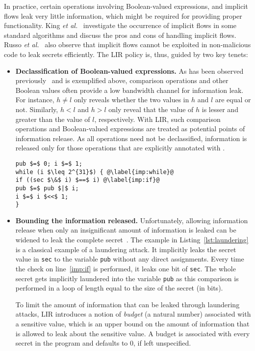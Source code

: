 In practice, certain operations involving Boolean-valued expressions, 
and implicit flows leak very 
little information, which might be required for providing proper
functionality. King \emph{et al.}~\cite{king08implicit} 
investigate the occurrence of implicit flows in some standard 
algorithms and discuss the pros and cons of handling implicit 
flows. Russo \emph{et al.}~\cite{implicit} also observe
that implicit flows cannot be exploited in non-malicious code to 
leak secrets efficiently. The LIR policy is, thus, guided by two key tenets: 

\begin{itemize}
\item \textbf{Declassification of Boolean-valued expressions.}  As has been
  observed previously~\cite{scd, dta} and is exemplified
  above, comparison operations and other Boolean values often provide a
  low bandwidth channel for information leak. For
  instance, $h \neq l$ only reveals whether the two values in $h$ and
  $l$ are equal or not. Similarly, $h < l$ and $h > l$ only reveal
  that the value of $h$ is lesser and greater than the value of $l$,
  respectively. With LIR, such comparison operations and Boolean-valued  
  expressions are treated as potential points of information release. 
  As all operations need not be declassified, 
  information is released only for those 
  operations that are explicitly annotated with .

\begin{lstlisting}[float, caption=Laundering attack via implicit flows, label=lst:laundering]
pub $=$ 0; i $=$ 1;
while (i $\leq 2^{31}$) { @\label{imp:while}@
if ((sec $\&$ i) $==$ i) @\label{imp:if}@
pub $=$ pub $|$ i;
i $=$ i $<<$ 1;
}
\end{lstlisting}

\item \textbf{Bounding the information released.} 
  Unfortunately, allowing information release when
  only an insignificant amount of information is leaked can be widened
  to leak the complete secret~\cite{relSec,delRelease}. 
  The example in Listing~\ref{lst:laundering} is a classical example 
  of a laundering attack. It implicitly leaks the secret value
  in \texttt{sec} to the variable \texttt{pub} without any direct assignments.
  Every time the check on line~\ref{imp:if} is performed, it leaks one
  bit of \texttt{sec}. The whole secret gets implicitly laundered into
  the variable \texttt{pub} as this comparison is performed in a loop of 
  length equal to the size of the secret (in bits).
  
  To limit the amount of information that can be leaked through 
  laundering attacks, LIR introduces a notion of \emph{budget} (a
  natural number) associated with a sensitive value, which is an
  upper bound on the amount of information that is allowed to leak about
  the sensitive value. A budget is associated with every secret in the
  program and defaults to $0$, if left unspecified. 
\end{itemize}

